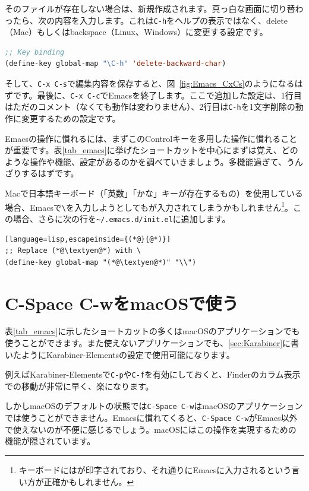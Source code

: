 そのファイルが存在しない場合は、新規作成されます。真っ白な画面に切り替わったら、次の内容を入力します。これは\texttt{C-h}をヘルプの表示ではなく、delete（Mac）もしくはbackspace（Linux、Windows）に変更する設定です。
\begin{lstlisting}[language=lisp]
;; Key binding
(define-key global-map "\C-h" 'delete-backward-char)
\end{lstlisting}
そして、\texttt{C-x C-s}で編集内容を保存すると、図~\ref{fig:Emacs_CxCs}のようになるはずです。最後に、\texttt{C-x C-c}でEmacsを終了します。ここで追加した設定は、1行目はただのコメント（なくても動作は変わりません）、2行目は\texttt{C-h}を1文字削除の動作に変更するための設定です。

Emacsの操作に慣れるには、まずこのControlキーを多用した操作に慣れることが重要です。表\ref{tab_emacs}に挙げたショートカットを中心にまずは覚え、どのような操作や機能、設定があるのかを調べていきましょう。多機能過ぎて、うんざりするはずです。

Macで日本語キーボード（「英数」「かな」キーが存在するもの）を使用している場合、Emacsで\texttt{\textbackslash}を入力しようとしても\texttt{\textyen}が入力されてしまうかもしれません\footnote{キーボードには\texttt{\textyen}が印字されており、それ通りにEmacsに入力されるという言い方が正確かもしれません。}。この場合、さらに次の行を\texttt{\~{}/.emacs.d/init.el}に追加します。
\begin{lstlisting}[language=lisp,escapeinside={(*@}{@*)}]
;; Replace (*@\textyen@*) with \ 
(define-key global-map "(*@\textyen@*)" "\\")
\end{lstlisting}

\section{C-Space C-wをmacOSで使う}

表\ref{tab_emacs}に示したショートカットの多くはmacOSのアプリケーションでも使うことができます。また使えないアプリケーションでも、\ref{sec:Karabiner}に書いたようにKarabiner-Elementsの設定で使用可能になります。

例えばKarabiner-Elementsで\texttt{C-p}や\texttt{C-f}を有効にしておくと、Finderのカラム表示での移動が非常に早く、楽になります。

しかしmacOSのデフォルトの状態では\texttt{C-Space C-w}はmacOSのアプリケーションでは使うことができません。Emacsに慣れてくると、\texttt{C-Space C-w}がEmacs以外で使えないのが不便に感じるでしょう。macOSにはこの操作を実現するための機能が隠されています。

